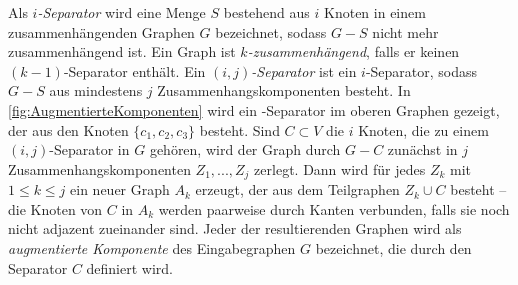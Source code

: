 Als \emph{$i$-Separator} wird eine Menge $S$ bestehend aus $i$ Knoten in einem zusammenhängenden Graphen $G$ bezeichnet, sodass $G - S$ nicht mehr zusammenhängend ist.
Ein Graph ist \emph{$k$-zusammenhängend}, falls er keinen $(k-1)$-Separator enthält.
Ein \emph{$(i, j)$-Separator} ist ein $i$-Separator, sodass $G-S$ aus mindestens $j$ Zusammenhangskomponenten besteht.
In \Abb \ref{fig:AugmentierteKomponenten} wird ein \dd-Separator im oberen Graphen gezeigt, der aus den Knoten $\{c_1, c_2, c_3\}$ besteht.
Sind $C \subset V$ die $i$ Knoten, die zu einem $(i, j)$-Separator in $G$ gehören, wird der Graph durch $G - C$ zunächst in $j$ Zusammenhangskomponenten $Z_1, ..., Z_j$ zerlegt.
Dann wird für jedes $Z_k$ mit $1 \leq k \leq j$ ein neuer Graph $A_k$ erzeugt, der aus dem Teilgraphen $Z_k \cup C$ besteht -- die Knoten von $C$ in $A_k$ werden paarweise durch Kanten verbunden, falls sie noch nicht adjazent zueinander sind.
Jeder der resultierenden Graphen wird als \emph{augmentierte Komponente} des Eingabegraphen $G$ bezeichnet, die durch den Separator $C$ definiert wird.

